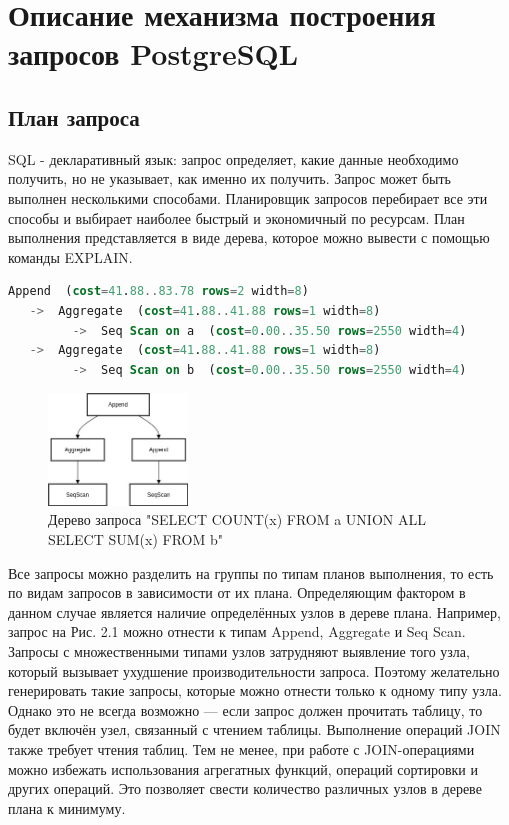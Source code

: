\chapter{Описание механизма построения запросов PostgreSQL}

\section{План запроса}

SQL - декларативный язык: запрос определяет, какие данные необходимо получить, но не указывает, как именно их получить. Запрос может быть выполнен несколькими способами. Планировщик запросов перебирает все эти способы и выбирает наиболее быстрый и экономичный по ресурсам. План выполнения представляется в виде дерева, которое можно вывести с помощью команды EXPLAIN. 

\begin{lstlisting}[language=SQL, caption={План выполнения с помощью EXPLAIN запроса "SELECT COUNT(x) FROM a UNION ALL SELECT SUM(x) FROM b"}, label={lst:explain_plan}]
Append  (cost=41.88..83.78 rows=2 width=8)
   ->  Aggregate  (cost=41.88..41.88 rows=1 width=8)
         ->  Seq Scan on a  (cost=0.00..35.50 rows=2550 width=4)
   ->  Aggregate  (cost=41.88..41.88 rows=1 width=8)
         ->  Seq Scan on b  (cost=0.00..35.50 rows=2550 width=4)
\end{lstlisting}

\begin{figure}[htbp]
	\centering
	\includegraphics[width=0.33\textwidth]{graphics/query_tree.jpg}
	\caption{Дерево запроса "SELECT COUNT(x) FROM a UNION ALL SELECT SUM(x) FROM b"}
	\label{fig:query_tree}
\end{figure}

Все запросы можно разделить на группы по типам планов выполнения, то есть по видам запросов в зависимости от их плана. Определяющим фактором в данном случае является наличие определённых узлов в дереве плана. Например, запрос на Рис. 2.1 можно отнести к типам Append, Aggregate и Seq Scan. Запросы с множественными типами узлов затрудняют выявление того узла, который вызывает ухудшение производительности запроса. Поэтому желательно генерировать такие запросы, которые можно отнести только к одному типу узла. Однако это не всегда возможно — если запрос должен прочитать таблицу, то будет включён узел, связанный с чтением таблицы. Выполнение операций JOIN также требует чтения таблиц. Тем не менее, при работе с JOIN-операциями можно избежать использования агрегатных функций, операций сортировки и других операций. Это позволяет свести количество различных узлов в дереве плана к минимуму.

